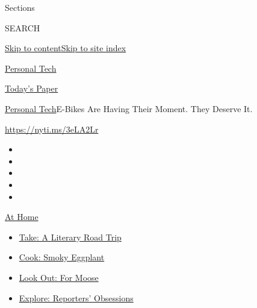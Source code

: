 Sections

SEARCH

\protect\hyperlink{site-content}{Skip to
content}\protect\hyperlink{site-index}{Skip to site index}

\href{https://www.nytimes3xbfgragh.onion/section/technology/personaltech}{Personal
Tech}

\href{https://myaccount.nytimes3xbfgragh.onion/auth/login?response_type=cookie\&client_id=vi}{}

\href{https://www.nytimes3xbfgragh.onion/section/todayspaper}{Today's
Paper}

\href{/section/technology/personaltech}{Personal Tech}\textbar{}E-Bikes
Are Having Their Moment. They Deserve It.

\url{https://nyti.ms/3eLA2Lr}

\begin{itemize}
\item
\item
\item
\item
\item
\end{itemize}

\href{https://www.nytimes3xbfgragh.onion/spotlight/at-home?action=click\&pgtype=Article\&state=default\&region=TOP_BANNER\&context=at_home_menu}{At
Home}

\begin{itemize}
\tightlist
\item
  \href{https://www.nytimes3xbfgragh.onion/2020/07/28/books/time-for-a-literary-road-trip.html?action=click\&pgtype=Article\&state=default\&region=TOP_BANNER\&context=at_home_menu}{Take:
  A Literary Road Trip}
\item
  \href{https://www.nytimes3xbfgragh.onion/2020/07/29/magazine/bored-with-your-home-cooking-some-smoky-eggplant-will-fix-that.html?action=click\&pgtype=Article\&state=default\&region=TOP_BANNER\&context=at_home_menu}{Cook:
  Smoky Eggplant}
\item
  \href{https://www.nytimes3xbfgragh.onion/2020/07/27/travel/moose-michigan-isle-royale.html?action=click\&pgtype=Article\&state=default\&region=TOP_BANNER\&context=at_home_menu}{Look
  Out: For Moose}
\item
  \href{https://www.nytimes3xbfgragh.onion/interactive/2020/at-home/even-more-reporters-editors-diaries-lists-recommendations.html?action=click\&pgtype=Article\&state=default\&region=TOP_BANNER\&context=at_home_menu}{Explore:
  Reporters' Obsessions}
\end{itemize}

